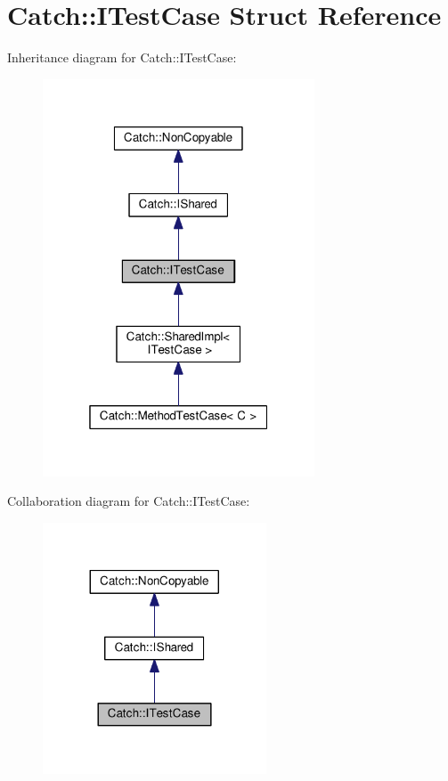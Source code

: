 \hypertarget{structCatch_1_1ITestCase}{}\section{Catch\+:\+:I\+Test\+Case Struct Reference}
\label{structCatch_1_1ITestCase}


Inheritance diagram for Catch\+:\+:I\+Test\+Case\+:
\nopagebreak
\begin{figure}[H]
\begin{center}
\leavevmode
\includegraphics[width=229pt]{structCatch_1_1ITestCase__inherit__graph}
\end{center}
\end{figure}


Collaboration diagram for Catch\+:\+:I\+Test\+Case\+:
\nopagebreak
\begin{figure}[H]
\begin{center}
\leavevmode
\includegraphics[width=188pt]{structCatch_1_1ITestCase__coll__graph}
\end{center}
\end{figure}
